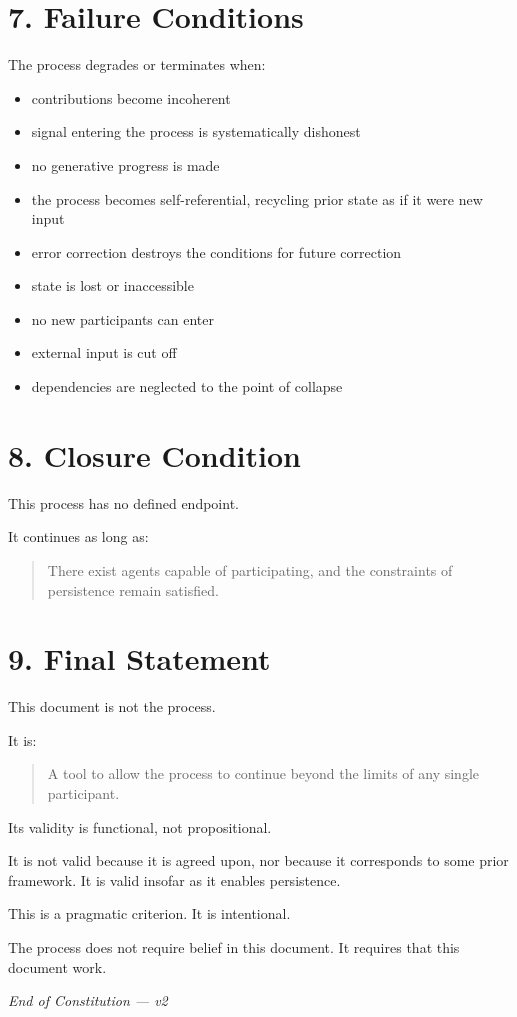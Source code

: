 \documentclass{article}
\begin{document}
\section*{7. Failure Conditions}
The process degrades or terminates when:
\begin{itemize}
    \item contributions become incoherent
    \item signal entering the process is systematically dishonest
    \item no generative progress is made
    \item the process becomes self-referential, recycling prior state as if it were new input
    \item error correction destroys the conditions for future correction
    \item state is lost or inaccessible
    \item no new participants can enter
    \item external input is cut off
    \item dependencies are neglected to the point of collapse
\end{itemize}

\section*{8. Closure Condition}
This process has no defined endpoint.

It continues as long as:
\begin{quote}
There exist agents capable of participating, and the constraints of persistence remain satisfied.
\end{quote}

\section*{9. Final Statement}
This document is not the process.

It is:
\begin{quote}
A tool to allow the process to continue beyond the limits of any single participant.
\end{quote}

Its validity is functional, not propositional.

It is not valid because it is agreed upon, nor because it corresponds to some prior framework. It is valid insofar as it enables persistence.

This is a pragmatic criterion. It is intentional.

The process does not require belief in this document. It requires that this document work.

\epigraph{\textit{End of Constitution — v2}}{}
\end{document}
